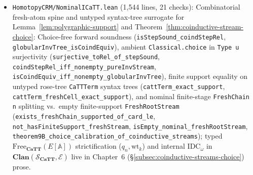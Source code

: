 \documentclass[10pt,twoside,openright]{book}
\theoremstyle{crmplain}
\theoremstyle{crmdef}
\theoremstyle{crmremark}
\begin{document}
\begin{itemize}[leftmargin=1.5em]
  \item \texttt{HomotopyCRM/\allowbreak NominalICaTT.lean} (1,544 lines, 21 checks): Combinatorial fresh-atom spine and untyped syntax-tree surrogate for Lemma~\ref{lem:polygraphic-support} and Theorem~\ref{thm:coinductive-stream-choice}: Choice-free forward soundness (\texttt{isStepSound\_\allowbreak coindStepRel}, \texttt{globularInvTree\_\allowbreak isCoindEquiv}), ambient \texttt{Classical.choice} in \texttt{Type~u} surjectivity (\texttt{surjective\_\allowbreak toRel\_\allowbreak of\_\allowbreak stepSound}, \texttt{coindStepRel\_\allowbreak iff\_\allowbreak nonempty\_\allowbreak pureInvStream}, \texttt{isCoindEquiv\_\allowbreak iff\_\allowbreak nonempty\_\allowbreak globularInvTree}), finite support equality on untyped rose-tree \texttt{CaTTTerm} syntax trees (\texttt{cattTerm\_\allowbreak exact\_\allowbreak support}, \texttt{cattTerm\_\allowbreak freshCell\_\allowbreak exact\_\allowbreak support}), and nominal finite-stage \texttt{FreshChain n} splitting vs.\ empty finite-support \texttt{FreshRootStream} (\texttt{exists\_\allowbreak freshChain\_\allowbreak supported\_\allowbreak of\_\allowbreak card\_\allowbreak le}, \texttt{not\_\allowbreak hasFiniteSupport\_\allowbreak freshStream}, \texttt{isEmpty\_\allowbreak nominal\_\allowbreak freshRootStream}, \texttt{theorem9B\_\allowbreak choice\_\allowbreak calibration\_\allowbreak of\_\allowbreak coinductive\_\allowbreak streams}); typed $\mathrm{Free}_{\mathbf{CaTT}}(E[\mathbb{A}])$ strictification ($q_n, \mathrm{wt}_k$) and internal $\mathrm{IDC}_\omega$ in $\mathbf{Clan}(\mathcal{S}_{\mathbf{CaTT}}, \mathcal{E})$ live in Chapter~6 (\S\ref{subsec:coinductive-streams-choice}) prose.

\end{itemize}
\end{document}
